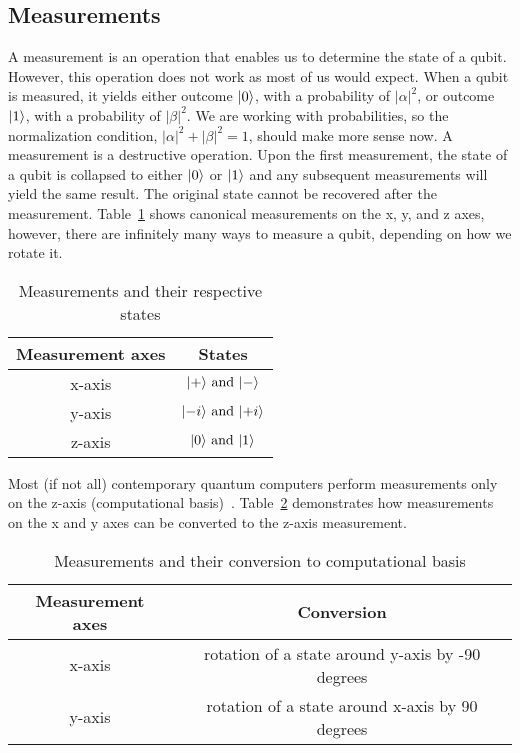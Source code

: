 \tocless\subsection{Measurements}\noindent
A measurement is an operation that enables us to determine the state of a qubit. However, this operation does not work as most of us would expect. When a qubit is measured, it yields either outcome $\lvert0\rangle$, with a probability of $\lvert \alpha \rvert^2$, or outcome $\lvert1\rangle$, with a probability of $\lvert \beta \rvert^2$. We are working with probabilities, so the normalization condition, $\lvert \alpha \rvert^2 + \lvert \beta \rvert^2 = 1$, should make more sense now. A measurement is a destructive operation. Upon the first measurement, the state of a qubit is collapsed to either $\lvert0\rangle$ or $\lvert1\rangle$ and any subsequent measurements will yield the same result. The original state cannot be recovered after the measurement. Table~\ref{tab:measurements-states} shows canonical measurements on the x, y, and z axes, however, there are infinitely many ways to measure a qubit, depending on how we rotate it.

\begin{table}[H]
  \centering
  \begin{tabular}{|c|c|} 
      \hline
      \multicolumn{1}{|c|}{\textbf{Measurement axes}} & \textbf{States}\\
      \hline
      x-axis & $\lvert+\rangle \text{ and }\lvert-\rangle$\\ 
      \hline
      y-axis & $\lvert-i\rangle \text{ and }\lvert+i\rangle$\\ 
      \hline
      z-axis & $\lvert0\rangle \text{ and }\lvert1\rangle$\\ 
      \hline
  \end{tabular}
  \caption{Measurements and their respective states}
  \label{tab:measurements-states}
\end{table}
Most (if not all) contemporary quantum computers perform measurements only on the z-axis (computational basis)~\cite{blog}. Table~\ref{tab:measurements-conversion} demonstrates how measurements on the x and y axes can be converted to the z-axis measurement.
\begin{table}[H]
  \centering
  \begin{tabular}{|c|c|} 
      \hline
      \multicolumn{1}{|c|}{\textbf{Measurement axes}} & \textbf{Conversion}\\
      \hline
      x-axis & rotation of a state around y-axis by -90 degrees \\ 
      \hline
      y-axis & rotation of a state around x-axis by 90 degrees \\ 
      \hline
  \end{tabular}
  \caption{Measurements and their conversion to computational basis}
  \label{tab:measurements-conversion}
\end{table}

